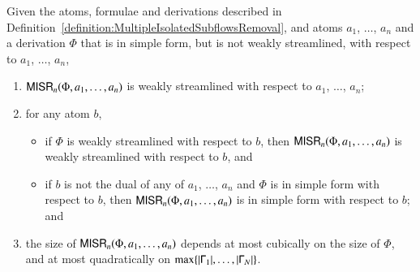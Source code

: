 \begin{proposition}\label{proposition:MultipleIsolatedSubflowRemover}
Given the atoms, formulae and derivations described in Definition~\vref{definition:MultipleIsolatedSubflowsRemoval}, and atoms $a_1$, $\dots$, $a_n$ and a derivation $\Phi$ that is in simple form, but is not weakly streamlined, with respect to $a_1$, $\dots$, $a_n$,
\begin{enumerate}
\item $\mathsf{MISR}_n(\Phi,a_1,\dots,a_n)$ is weakly streamlined with respect to $a_1$, $\dots$, $a_n$;
\item for any atom $b$,
\begin{itemize}
\item if $\Phi$ is weakly streamlined with respect to $b$, then $\mathsf{MISR}_n(\Phi,a_1,\dots,a_n)$ is weakly streamlined with respect to $b$, and
\item if $b$ is not the dual of any of $a_1$, $\dots$, $a_n$ and $\Phi$ is in simple form with respect to $b$, then $\mathsf{MISR}_n(\Phi,a_1,\dots,a_n)$ is in simple form with respect to $b$; and
\end{itemize}
\item the size of\/ $\mathsf{MISR}_n(\Phi,a_1,\dots,a_n)$ depends at most cubically on the size of\/ $\Phi$, and at most quadratically on $\max\{{\left\vert \mathsf\Gamma_1\right\vert},\dots,{\left\vert \mathsf\Gamma_N\right\vert}\}$.
\end{enumerate}
\end{proposition}

